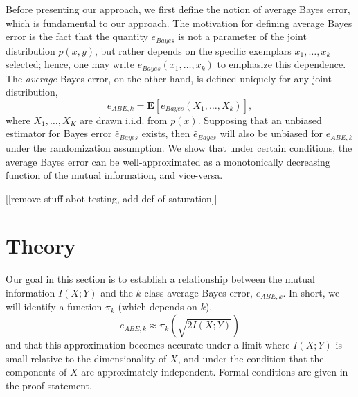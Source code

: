\documentclass{article}
\newcommand{\E}{\textbf{E}}
\begin{document}
Before presenting our approach, we first define the notion of average
Bayes error, which is fundamental to our approach.  The motivation for
defining average Bayes error is the fact that the quantity $e_{Bayes}$
is not a parameter of the joint distribution $p(x, y)$, but rather
depends on the specific exemplars $x_1,\hdots, x_k$ selected; hence,
one may write $e_{Bayes}(x_1,\hdots, x_k)$ to emphasize this
dependence.  The \emph{average} Bayes error, on the other hand, is
defined uniquely for any joint distribution,
\begin{equation}\label{eq:abe}
e_{ABE, k} = \E[e_{Bayes}(X_1,\hdots, X_k)],
\end{equation}
where $X_1,\hdots, X_K$ are drawn i.i.d. from $p(x)$.  Supposing that
an unbiased estimator for Bayes error $\hat{e}_{Bayes}$ exists, then
$\hat{e}_{Bayes}$ will also be unbiased for $e_{ABE, k}$ under the
randomization assumption.  We show that under certain conditions, the
average Bayes error can be well-approximated as a monotonically
decreasing function of the mutual information, and vice-versa.

[[remove stuff abot testing, add def of saturation]]

\section{Theory}

Our goal in this section is to establish a relationship between the
mutual information $I(X; Y)$ and the $k$-class average Bayes error,
$e_{ABE, k}$.  In short, we will identify a function $\pi_k$
(which depends on $k$),
\[
e_{ABE, k} \approx \pi_k(\sqrt{2 I(X; Y)})
\]
and that this approximation becomes accurate under a limit where $I(X; Y)$ is small relative to the dimensionality of $X$,
and under the condition that the components of $X$ are approximately independent.  Formal conditions are given in the proof statement.
\end{document}
